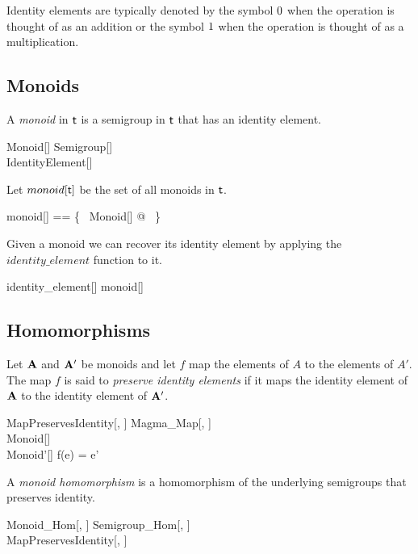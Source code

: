 \documentclass{amsart}
\begin{document}
Identity elements are typically denoted by the symbol  $0$ when the operation is thought of as an addition
or the symbol $1$ when the operation is thought of as a multiplication.

\subsection{Monoids}

A \textit{monoid} in $\mathsf{t}$ is a semigroup in $\mathsf{t}$ that has an identity element.
\begin{schema}{Monoid}[\genT]
	Semigroup[\genT] \\
	IdentityElement[\genT]
\end{schema}

Let $monoid[\mathsf{t}]$ be the set of all monoids in $\mathsf{t}$.
\begin{zed}
	monoid[\genT] == \{~ Monoid[\genT] @ \strucA ~\}
\end{zed}

\begin{remark}
Given a monoid we can recover its identity element by applying the $identity\_element$
function to it.

\begin{zed}
	identity\_element[\setT] \in monoid[\setT] \fun \setT
\end{zed}

\end{remark}

\subsection{Homomorphisms}

Let $\mathbf{A}$ and $\mathbf{A}'$ be monoids and let $f$ map the elements of $A$ to the elements of $A'$.
The map $f$ is said to \textit{preserve identity elements} if it maps the identity element of $\mathbf{A}$
to the identity element of $\mathbf{A}'$.

\begin{schema}{MapPreservesIdentity}[\genT, \genU]
	Magma\_Map[\genT, \genU] \\
	Monoid[\genT] \\
	Monoid'[\genU]
\where
	f(e) = e'
\end{schema}

A {\em monoid homomorphism} is a homomorphism of the underlying semigroups
that preserves identity.

\begin{schema}{Monoid\_Hom}[\genT, \genU]
	Semigroup\_Hom[\genT, \genU] \\
	 MapPreservesIdentity[\genT, \genU]
\end{schema}
\end{document}
